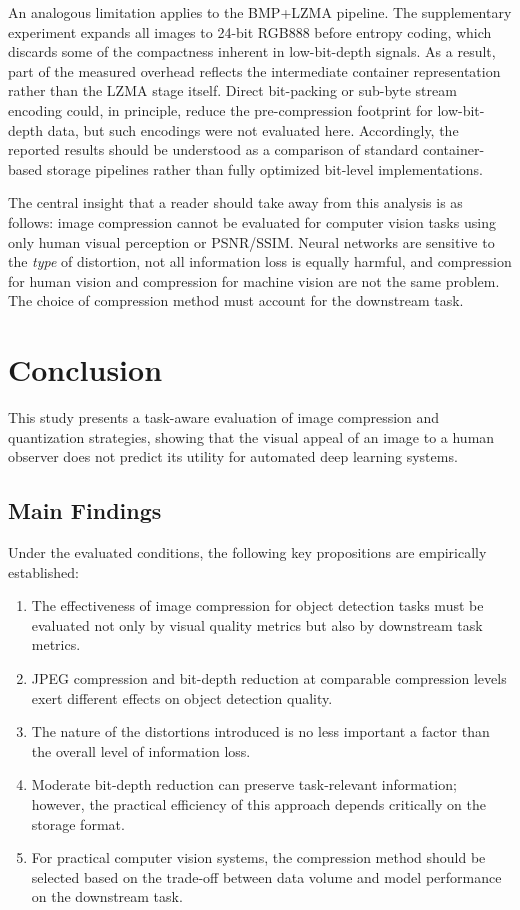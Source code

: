 \documentclass[12pt, a4paper]{article}
\begin{document}
An analogous limitation applies to the BMP+LZMA pipeline. The supplementary experiment expands all images to 24-bit RGB888 before entropy coding, which discards some of the compactness inherent in low-bit-depth signals. As a result, part of the measured overhead reflects the intermediate container representation rather than the LZMA stage itself. Direct bit-packing or sub-byte stream encoding could, in principle, reduce the pre-compression footprint for low-bit-depth data, but such encodings were not evaluated here. Accordingly, the reported results should be understood as a comparison of standard container-based storage pipelines rather than fully optimized bit-level implementations.

The central insight that a reader should take away from this analysis is as follows: image compression cannot be evaluated for computer vision tasks using only human visual perception or PSNR/SSIM. Neural networks are sensitive to the \textit{type} of distortion, not all information loss is equally harmful, and compression for human vision and compression for machine vision are not the same problem. The choice of compression method must account for the downstream task.

\section{Conclusion}
This study presents a task-aware evaluation of image compression and quantization strategies, showing that the visual appeal of an image to a human observer does not predict its utility for automated deep learning systems.

\subsection{Main Findings}
Under the evaluated conditions, the following key propositions are empirically established:
\begin{enumerate}
    \item The effectiveness of image compression for object detection tasks must be evaluated not only by visual quality metrics but also by downstream task metrics.
    \item JPEG compression and bit-depth reduction at comparable compression levels exert different effects on object detection quality.
    \item The nature of the distortions introduced is no less important a factor than the overall level of information loss.
    \item Moderate bit-depth reduction can preserve task-relevant information; however, the practical efficiency of this approach depends critically on the storage format.
    \item For practical computer vision systems, the compression method should be selected based on the trade-off between data volume and model performance on the downstream task.
\end{enumerate}
\end{document}
